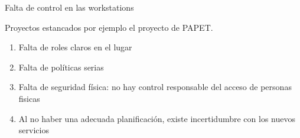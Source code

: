 \documentclass[a4paper,11pt,oneside]{article}
\begin{document}
Falta de control en las workstations

Proyectos estancados por ejemplo el proyecto de PAPET.

\begin{enumerate}
\item Falta de roles claros en el lugar
\item Falta de políticas serias
\item Falta de seguridad física: no hay control responsable del acceso
  de personas fisicas
\item Al no haber una adecuada planificación, existe incertidumbre con
  los nuevos servicios
\end{enumerate}
\end{document}
